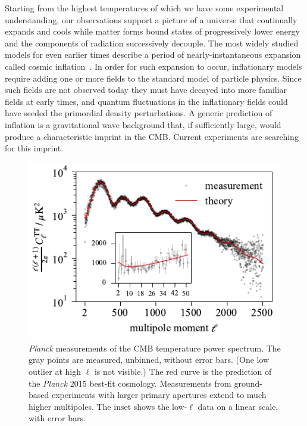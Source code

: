 Starting from the highest temperatures of which we have some experimental understanding, our observations support a picture of a universe that continually expands and cools while matter forms bound states of progressively lower energy and the components of radiation successively decouple.
The most widely studied models for even earlier times describe a period of nearly-instantaneous expansion called cosmic inflation~\autocite{Guth1981PRD}.
In order for such expansion to occur, inflationary models require adding one or more fields to the standard model of particle physics.
Since such fields are not observed today they must have decayed into more familiar fields at early times, and quantum fluctuations in the inflationary fields could have seeded the primordial density perturbations.
A generic prediction of inflation is a gravitational wave background that, if sufficiently large, would produce a characteristic imprint in the CMB.
Current experiments are searching for this imprint.

\begin{figure}[htb]
\centering
\includegraphics[width=\textwidth]{cmb/cmb_temperature_power_spectrum.pdf}
\caption[\textit{Planck} measurements of the CMB temperature power spectrum.]
{
\textit{Planck} measurements of the CMB temperature power spectrum.
The gray points are measured, unbinned, without error bars.
(One low outlier at high $\ell$ is not visible.)
The red curve is the prediction of the \textit{Planck} 2015 best-fit cosmology.
Measurements from ground-based experiments with larger primary apertures extend to much higher multipoles.
The inset shows the low-$\ell$ data on a linear scale, with error bars.
}
\label{fig:cmb_tt_power_spectrum}
\end{figure}

